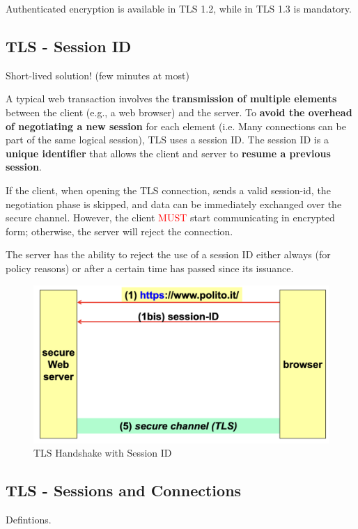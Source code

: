 Authenticated encryption is available in TLS 1.2, while in TLS 1.3 is mandatory.

\subsection{TLS - Session ID}
\begin{center}
    Short-lived solution! (few minutes at most)
\end{center}
A typical web transaction involves the \textbf{transmission of multiple elements} between the client (e.g., a web browser) and the server. To \textbf{avoid the overhead of negotiating a new session} for each element (i.e. Many connections can be part of the same logical session), TLS uses a session ID. The session ID is a \textbf{unique identifier} that allows the client and server to \textbf{resume a previous session}.

If the client, when opening the TLS connection, sends a valid session-id, the negotiation phase is skipped, and data can be immediately exchanged over the secure channel. However, the client \textcolor{Red}{MUST} start communicating in encrypted form; otherwise, the server will reject the connection.

\begin{tcolorbox}[colback=red!10!white, colframe=red!70!black, coltitle=white, title=Beware]
    The server has the ability to reject the use of a session ID either always (for policy reasons) or after a certain time has passed since its issuance.
\end{tcolorbox}

\begin{figure}[H]
    \centering
    \includegraphics[width=0.6\linewidth]{Images/Appsec/handshake_tls_sess.png}
    \caption{TLS Handshake with Session ID}
\end{figure}

\subsection{TLS - Sessions and Connections}
\begin{center}
    Defintions.
\end{center}



